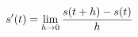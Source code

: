 \documentclass[preview]{standalone}
\begin{document}
\begin{align*}
\special{dvisvgm:raw <g id='unique000'>}s'(t)=\lim_{h\to 0}\frac{s(t+h)-s(t)}{h}\special{dvisvgm:raw </g>}
\end{align*}
\end{document}
